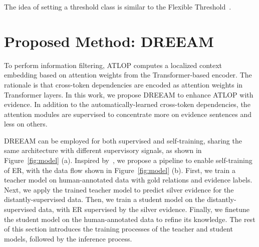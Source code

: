 \documentclass[11pt]{article}
\begin{document}
The idea of setting a threshold class is similar to the Flexible Threshold~\cite{chen-etal-2020-hierarchical}.


\section{Proposed Method: DREEAM}

\begin{figure*}
    \centering
    \hspace{.03\textwidth}
    \caption{Model architecture and the information flow during self-training. In (a), gold/silver evidence distributions come from human-annotations/the teacher model. In (b), arrows represent the direction of knowledge transfer.}
    \label{fig:model}
\end{figure*}
To perform information filtering, ATLOP computes a localized context embedding based on attention weights from the Transformer-based encoder.
The rationale is that cross-token dependencies are encoded as attention weights in Transformer layers.
In this work, we propose DREEAM to enhance ATLOP with evidence.
In addition to the automatically-learned cross-token dependencies, the attention modules are supervised to concentrate more on evidence sentences and less on others.

DREEAM can be employed for both supervised and self-training, sharing the same architecture with different supervisory signals, as shown in Figure~\ref{fig:model} (a).
Inspired by~\citet{tan-etal-2022-document}, we propose a pipeline to enable self-training of ER, with the data flow shown in Figure~\ref{fig:model} (b).
First, we train a teacher model on human-annotated data with gold relations and evidence labels.
Next, we apply the trained teacher model to predict silver evidence for the distantly-supervised data.
Then, we train a student model on the distantly-supervised data, with ER supervised by the silver evidence. 
Finally, we finetune the student model on the human-annotated data to refine its knowledge.
The rest of this section introduces the training processes of the teacher and student models, followed by the inference process.
\end{document}

